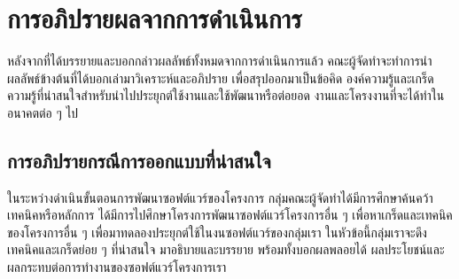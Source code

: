 \documentclass[12pt,one side,openright,a4paper]{cpe-thesis-th}
\newcommand{\thaijustify}[1]{%
  \par\hspace{30pt}\justifying
  #1
}
\begin{document}
\section{การอภิปรายผลจากการดำเนินการ}
    \thaijustify{
        หลังจากที่ได้บรรยายและบอกกล่าวผลลัพธ์ทั้งหมดจากการดำเนินการแล้ว คณะผู้จัดทำจะทำการนำผลลัพธ์ข้างต้นที่ได้บอกเล่ามาวิเคราะห์และอภิปราย เพื่อสรุปออกมาเป็นข้อคิด องค์ความรู้และเกร็ดความรู้ที่น่าสนใจสำหรับนำไปประยุกต์ใช้งานและใช้พัฒนาหรือต่อยอด งานและโครงงานที่จะได้ทำในอนาคตต่อ ๆ ไป
    }
    \subsection{การอภิปรายกรณีการออกแบบที่น่าสนใจ}
        \thaijustify{
            ในระหว่างดำเนินขั้นตอนการพัฒนาซอฟต์แวร์ของโครงการ กลุ่มคณะผู้จัดทำได้มีการศึกษาค้นคว้าเทคนิคหรือหลักการ ได้มีการไปศึกษาโครงการพัฒนาซอฟต์แวร์โครงการอื่น ๆ เพื่อหาเกร็ดและเทคนิคของโครงการอื่น ๆ เพื่อมาทดลองประยุกต์ใช้ในงนซอฟต์แวร์ของกลุ่มเรา ในหัวข้อนี้กลุ่มเราจะดึงเทคนิคและเกร็ดย่อย ๆ ที่น่าสนใจ มาอธิบายและบรรยาย พร้อมทั้งบอกผลพลอยได้ ผลประโยชน์และผลกระทบต่อการทำงานของซอฟต์แวร์โครงการเรา
        }
\end{document}
